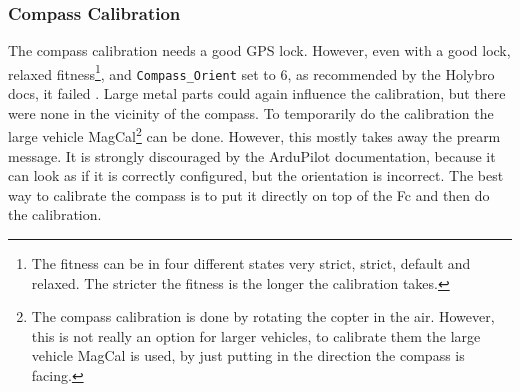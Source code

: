 \documentclass[svgnames]{article}
\begin{document}
	\subsubsection{Compass Calibration}
	The compass calibration needs a good \gls{GPS} lock. However, even with a good lock, relaxed fitness\footnote{The fitness can be in four different states very strict, strict, default and relaxed. The stricter the fitness is the longer the calibration takes.}, and \lstinline|Compass_Orient| set to 6, as recommended by the Holybro docs, it failed \cite{HolybroDocs}. Large metal parts could again influence the calibration, but there were none in the vicinity of the compass. To temporarily do the calibration the large vehicle MagCal\footnote{The compass calibration is done by rotating the copter in the air. However, this is not really an option for larger vehicles, to calibrate them the large vehicle MagCal is used, by just putting in the direction the compass is facing.} can be done. However, this mostly takes away the prearm message. It is strongly discouraged by the ArduPilot documentation, because it can look as if it is correctly configured, but the orientation is incorrect. The best way to calibrate the compass is to put it directly on  top of the \gls{Fc} and then do the calibration.
\end{document}

